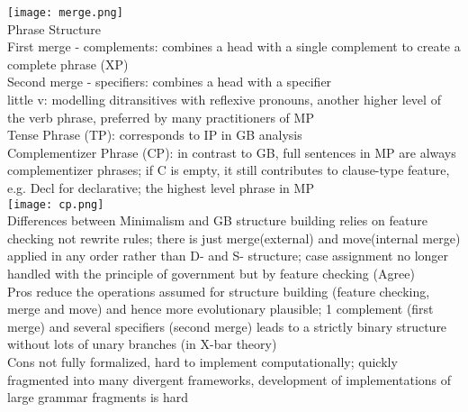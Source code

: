 \texttt{[image: merge.png]}\\
\scriptsize{Phrase Structure} \\
{\tiny First merge - complements: combines a head with a single complement to create a complete phrase (XP)\\
Second merge - specifiers: combines a head with a specifier\\
little v: modelling ditransitives with reflexive pronouns, another higher level of the verb phrase, preferred by many practitioners of MP\\
Tense Phrase (TP): corresponds to IP in GB analysis\\
Complementizer Phrase (CP): in contrast to GB, full sentences in MP are always complementizer phrases; if C is empty, it still contributes to clause-type feature, e.g. Decl for declarative; the highest level phrase in MP\\
\texttt{[image: cp.png]}
}\\
\scriptsize{Differences between Minimalism and GB}
{\tiny structure building relies on feature checking not rewrite rules; there is just merge(external) and move(internal merge) applied in any order rather than D- and S- structure; case assignment no longer handled with the principle of government but by feature checking (Agree)}\\
\scriptsize{Pros}
{\tiny reduce the operations assumed for structure building (feature checking, merge and move) and hence more evolutionary plausible; 1 complement (first merge) and several specifiers (second merge) leads to a strictly binary structure without lots of unary branches (in X-bar theory)
}\\
\scriptsize{Cons}
{\tiny not fully formalized, hard to implement computationally; quickly fragmented into many divergent frameworks, development of implementations of large grammar fragments is hard
}